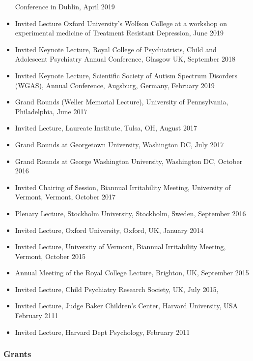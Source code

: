 \documentclass[
]{article}
\begin{document}
\begin{itemize}
  Conference in Dublin, April 2019
\item
  Invited Lecture Oxford University's Wolfson College at a workshop on
  experimental medicine of Treatment Resistant Depression, June 2019
\item
  Invited Keynote Lecture, Royal College of Psychiatrists, Child and
  Adolescent Psychiatry Annual Conference, Glasgow UK, September 2018
\item
  Invited Keynote Lecture, Scientific Society of Autism Spectrum
  Disorders (WGAS), Annual Conference, Augsburg, Germany, February 2019
\item
  Grand Rounds (Weller Memorial Lecture), University of Pennsylvania,
  Philadelphia, June 2017
\item
  Invited Lecture, Laureate Institute, Tulsa, OH, August 2017
\item
  Grand Rounds at Georgetown University, Washington DC, July 2017
\item
  Grand Rounds at George Washington University, Washington DC, October
  2016
\item
  Invited Chairing of Session, Biannual Irritability Meeting, University
  of Vermont, Vermont, October 2017
\item
  Plenary Lecture, Stockholm University, Stockholm, Sweden, September
  2016
\item
  Invited Lecture, Oxford University, Oxford, UK, January 2014
\item
  Invited Lecture, University of Vermont, Biannual Irritability Meeting,
  Vermont, October 2015
\item
  Annual Meeting of the Royal College Lecture, Brighton, UK, September
  2015
\item
  Invited Lecture, Child Psychiatry Research Society, UK, July 2015,
\item
  Invited Lecture, Judge Baker Children's Center, Harvard University,
  USA February 2111
\item
  Invited Lecture, Harvard Dept Psychology, February 2011
\end{itemize}

\hypertarget{grants}{%
\subsubsection{Grants}\label{grants}}
\end{document}
